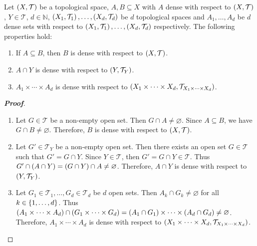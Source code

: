 \begin{proposition}
  Let $\left(X,\mathcal{T}\right)$ be a topological space, $A,B\subseteq X$ with $A$ dense with respect to $\left(X,\mathcal{T}\right)$, $Y\in\mathcal{T}$, $d\in\mathbb{N}$, $\left(X_1,\mathcal{T}_1\right),\dots,\left(X_d,\mathcal{T}_d\right)$ be $d$ topological spaces and $A_1,\dots,A_d$ be $d$ dense sets with respect to $\left(X_1,\mathcal{T}_1\right),\dots,\left(X_d,\mathcal{T}_d\right)$ respectively. The following properties hold:

  \begin{enumerate}
      \item If $A\subseteq B$, then $B$ is dense with respect to $\left(X,\mathcal{T}\right)$.
      \item $A\cap Y$ is dense with respect to $\left(Y,\mathcal{T}_Y\right)$.
      \item $A_1\times\cdots\times A_d$ is dense with respect to $\left(X_1\times\cdots\times X_d,\mathcal{T}_{X_1\times\cdots\times X_d}\right)$.
  \end{enumerate}
  \begin{proof}[\rm\textbf{Proof}]
    \hfill
    \begin{enumerate}
      \item Let $G\in\mathcal{T}$ be a non-empty open set. Then $G\cap A\neq\varnothing$. Since $A\subseteq B$, we have $G\cap B\neq\varnothing$. Therefore, $B$ is dense with respect to $\left(X,\mathcal{T}\right)$.
      \item Let $G'\in\mathcal{T}_Y$ be a non-empty open set. Then there exists an open set $G\in\mathcal{T}$ such that $G'=G\cap Y$. Since $Y\in\mathcal{T}$, then $G'=G\cap Y\in\mathcal{T}$. Thus $G'\cap\left(A\cap Y\right)=\left(G\cap Y\right)\cap A\neq\varnothing$. Therefore, $A\cap Y$ is dense with respect to $\left(Y,\mathcal{T}_Y\right)$.
      \item Let $G_1\in\mathcal{T}_1,\dots,G_d\in\mathcal{T}_d$ be $d$ open sets. Then $A_k\cap G_k\neq\varnothing$ for all $k\in\left\{1,\dots,d\right\}$. Thus $\left(A_1\times\cdots\times A_d\right)\cap\left(G_1\times\cdots\times G_d\right)=\left(A_1\cap G_1\right)\times\cdots\times\left(A_d\cap G_d\right)\neq\varnothing$. Therefore, $A_1\times\cdots\times A_d$ is dense with respect to $\left(X_1\times\cdots\times X_d,\mathcal{T}_{X_1\times\cdots\times X_d}\right)$.
    \end{enumerate}
  \end{proof}
\end{proposition}